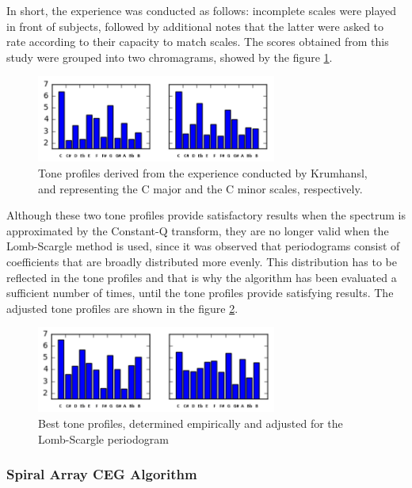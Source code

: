 \documentclass[letterpaper]{article}
\begin{document}
In short, the experience was conducted as follows: incomplete scales were played in front of subjects, followed by additional notes that the latter were asked to rate according to their capacity to match scales. The scores obtained from this study were grouped into two chromagrams, showed by the figure \ref{krumhansl}. \\

\begin{figure}
\begin{center}
\includegraphics[width=3.1in,angle=0]{imgs/Krumhansl.png}
\caption{Tone profiles derived from the experience conducted by Krumhansl, and representing the C major and the C minor scales, respectively.}
\label{krumhansl}
\end{center}
\end{figure}

Although these two tone profiles provide satisfactory results when the spectrum is approximated by the Constant-Q transform, they are no longer valid 
when the Lomb-Scargle method is used, since it was observed that periodograms consist of coefficients that are broadly distributed more evenly. This distribution has to be reflected in the tone profiles and that is why the algorithm has been evaluated a sufficient number of times, until the tone profiles
provide satisfying results. The adjusted tone profiles are shown in the figure \ref{profiles}.

\begin{figure}
\begin{center}
\includegraphics[width=3.1in,angle=0]{imgs/Custom.png}
\caption{Best tone profiles, determined empirically and adjusted for the Lomb-Scargle periodogram}
\label{profiles}
\end{center}
\end{figure}

\subsubsection{Spiral Array CEG Algorithm}
\end{document}
